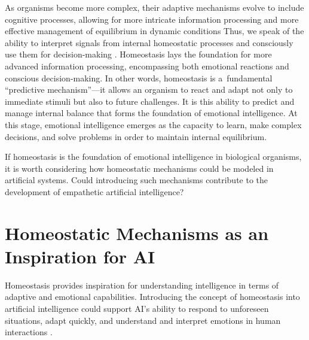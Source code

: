 As organisms become more complex, their adaptive mechanisms evolve to include cognitive processes, allowing for more intricate information processing and more effective management of equilibrium in dynamic conditions 
\parencite[][]{davies_adaptive_2016} %
 Thus, we speak of the ability to interpret signals from internal homeostatic processes and consciously use them for decision-making 
\parencite[][]{billman_homeostasis_2013}. %
 Homeostasis lays the foundation for more advanced information processing, encompassing both emotional reactions and conscious decision-making. In other words, homeostasis is a~fundamental ``predictive mechanism''---it allows an organism to react and adapt not only to immediate stimuli but also to future challenges. It is this ability to predict and manage internal balance that forms the foundation of emotional intelligence. At this stage, emotional intelligence emerges as the capacity to learn, make complex decisions, and solve problems in order to maintain internal equilibrium.~



If homeostasis is the foundation of emotional intelligence in biological organisms, it is worth considering how homeostatic mechanisms could be modeled in artificial systems. Could introducing such mechanisms contribute to the development of empathetic artificial intelligence?



\section*{Homeostatic Mechanisms as an Inspiration for AI}

Homeostasis provides inspiration for understanding intelligence in terms of adaptive and emotional capabilities. Introducing the concept of homeostasis into artificial intelligence could support AI's ability to respond to unforeseen situations, adapt quickly, and understand and interpret emotions in human interactions 
\parencites[][]{gros_emotions_2021}[][]{zhou_emotional_2021}.%
~



